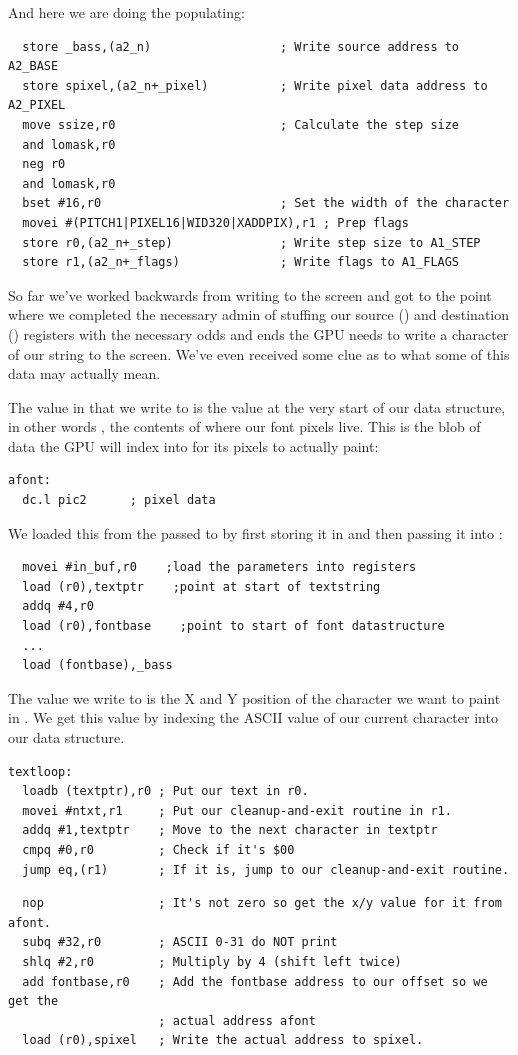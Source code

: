 And here we are doing the populating:

\begin{lstlisting}
  store _bass,(a2_n)                  ; Write source address to A2_BASE
  store spixel,(a2_n+_pixel)          ; Write pixel data address to A2_PIXEL
  move ssize,r0                       ; Calculate the step size
  and lomask,r0 
  neg r0
  and lomask,r0
  bset #16,r0                         ; Set the width of the character
  movei #(PITCH1|PIXEL16|WID320|XADDPIX),r1 ; Prep flags
  store r0,(a2_n+_step)               ; Write step size to A1_STEP 
  store r1,(a2_n+_flags)              ; Write flags to A1_FLAGS
\end{lstlisting}

So far we've worked backwards from writing to the screen and got to the point where we completed the necessary admin of stuffing our
source () and destination () registers with the necessary odds and ends the GPU needs to write a character of our string to the
screen.  We've even received some clue as to what some of this data may actually mean.

The value in  that we write to  is the value at the very start of our  data structure, in other words , the contents
of  where our font pixels live. This is the blob of data the GPU will index into for its pixels to actually paint:
\begin{lstlisting}
afont:  
  dc.l pic2      ; pixel data
\end{lstlisting}

We loaded this from the  passed to  by first storing it in  and then passing it into :
\begin{lstlisting}
  movei #in_buf,r0    ;load the parameters into registers
  load (r0),textptr    ;point at start of textstring
  addq #4,r0
  load (r0),fontbase    ;point to start of font datastructure
  ...
  load (fontbase),_bass
\end{lstlisting}

The value  we write to  is the X and Y position of the character we want to paint in . We get this
value by indexing the ASCII value of our current character into our  data structure. 

\begin{lstlisting}
textloop:
  loadb (textptr),r0 ; Put our text in r0.
  movei #ntxt,r1     ; Put our cleanup-and-exit routine in r1.
  addq #1,textptr    ; Move to the next character in textptr
  cmpq #0,r0         ; Check if it's $00
  jump eq,(r1)       ; If it is, jump to our cleanup-and-exit routine.
\end{lstlisting}
\begin{lstlisting}
  nop                ; It's not zero so get the x/y value for it from afont.
  subq #32,r0        ; ASCII 0-31 do NOT print
  shlq #2,r0         ; Multiply by 4 (shift left twice)
  add fontbase,r0    ; Add the fontbase address to our offset so we get the
                     ; actual address afont
  load (r0),spixel   ; Write the actual address to spixel.
\end{lstlisting}

